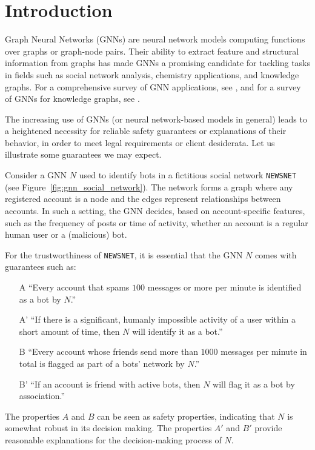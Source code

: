 \section{Introduction}
\label{sec:intro}

Graph Neural Networks (GNNs) are %
neural network models computing functions over graphs or graph-node pairs. Their ability to extract feature and structural information from
graphs
has made GNNs a promising candidate for%
tackling tasks in fields such as social network analysis, chemistry applications, and knowledge graphs. For a comprehensive survey of 
GNN applications, see \citet{ZhouCHZYLWLS20}, and for a survey of GNNs for knowledge graphs, see \citet{YeKSSW22}.

The increasing use of GNNs (or neural network-based models in general) leads to a heightened necessity for reliable safety guarantees or explanations of their behavior, in order to meet legal requirements or client desiderata. Let us illustrate some guarantees we may expect.

\begin{example}
\label{ex:gnn_social_network}
    Consider a GNN $N$ used to identify bots in a fictitious social network \texttt{NEWSNET} (see Figure~\ref{fig:gnn_social_network}). The network forms a graph where any registered account is a node and the edges represent relationships between accounts. In such a setting, the GNN decides, based on account-specific features, such as the frequency of posts or time of activity, whether an account is a regular human user or a (malicious) bot.

 For the trustworthiness of \texttt{NEWSNET}, it is essential that the GNN $N$  comes with guarantees such as:

    \begin{enumerate}
        \item[A\phantom{'}] ``Every account that spams $100$ messages or more per minute is identified as a bot by $N$.''
        \item[A'] ``If there is a significant, humanly impossible activity of a user within a short amount of time, then $N$ will identify it as a bot.''
        \item[B\phantom{'}] ``Every account whose friends send more than $1000$ messages per minute in total is flagged as part of a bots' network by $N$.''
        \item[B'] ``If an account is friend with active bots, then $N$ will flag it as a bot by association.''
    \end{enumerate}
%    
    The properties $A$ and $B$ can be seen as safety properties, indicating that $N$ is somewhat robust in its decision making. The properties $A'$ and $B'$ provide reasonable explanations for the decision-making process of $N$.
\end{example}


